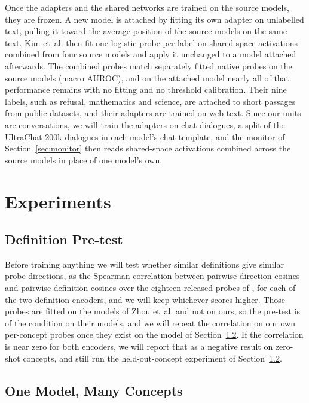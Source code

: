 \documentclass{article}
\newcommand{\etal}{et~al.\spacefactor=1000\relax}
\begin{document}
Once the adapters and the shared networks are trained on the source models, they are frozen. A new model is attached by fitting its own adapter on unlabelled text, pulling it toward the average position of the source models on the same text. Kim \etal{} then fit one logistic probe per label on shared-space activations combined from four source models and apply it unchanged to a model attached afterwards. The combined probes match separately fitted native probes on the source models (macro AUROC), and on the attached model nearly all of that performance remains with no fitting and no threshold calibration. Their nine labels, such as refusal, mathematics and science, are attached to short passages from public datasets, and their adapters are trained on web text. Since our units are conversations, we will train the adapters on chat dialogues, a split of the UltraChat 200k dialogues in each model's chat template, and the monitor of Section~\ref{sec:monitor} then reads shared-space activations combined across the source models in place of one model's own.

\section{Experiments}
\label{sec:exp}

\subsection{Definition Pre-test}
\label{sec:pretest}

Before training anything we will test whether similar definitions give similar probe directions, as the Spearman correlation between pairwise direction cosines and pairwise definition cosines over the eighteen released probes of \cite{zhou2026}, for each of the two definition encoders, and we will keep whichever scores higher. Those probes are fitted on the models of Zhou \etal{} and not on ours, so the pre-test is of the condition on their models, and we will repeat the correlation on our own per-concept probes once they exist on the model of Section~\ref{sec:single}. If the correlation is near zero for both encoders, we will report that as a negative result on zero-shot concepts, and still run the held-out-concept experiment of Section~\ref{sec:single}.

\subsection{One Model, Many Concepts}
\label{sec:single}
\end{document}

